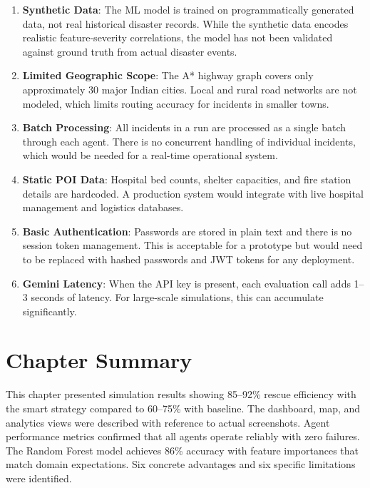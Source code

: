 \begin{enumerate}[leftmargin=*]
    \item \textbf{Synthetic Data}: The ML model is trained on programmatically generated data, not real historical disaster records. While the synthetic data encodes realistic feature-severity correlations, the model has not been validated against ground truth from actual disaster events.

    \item \textbf{Limited Geographic Scope}: The A* highway graph covers only approximately 30 major Indian cities. Local and rural road networks are not modeled, which limits routing accuracy for incidents in smaller towns.

    \item \textbf{Batch Processing}: All incidents in a run are processed as a single batch through each agent. There is no concurrent handling of individual incidents, which would be needed for a real-time operational system.

    \item \textbf{Static POI Data}: Hospital bed counts, shelter capacities, and fire station details are hardcoded. A production system would integrate with live hospital management and logistics databases.

    \item \textbf{Basic Authentication}: Passwords are stored in plain text and there is no session token management. This is acceptable for a prototype but would need to be replaced with hashed passwords and JWT tokens for any deployment.

    \item \textbf{Gemini Latency}: When the API key is present, each evaluation call adds 1--3 seconds of latency. For large-scale simulations, this can accumulate significantly.
\end{enumerate}

\section{Chapter Summary}
\label{sec:ch8_summary}

This chapter presented simulation results showing 85--92\% rescue efficiency with the smart strategy compared to 60--75\% with baseline. The dashboard, map, and analytics views were described with reference to actual screenshots. Agent performance metrics confirmed that all agents operate reliably with zero failures. The Random Forest model achieves 86\% accuracy with feature importances that match domain expectations. Six concrete advantages and six specific limitations were identified.
